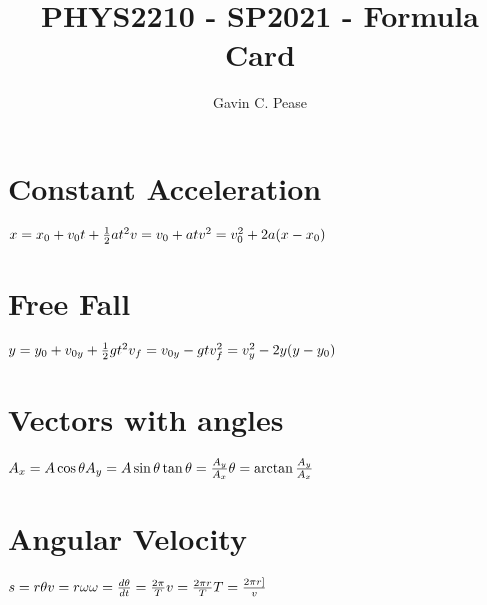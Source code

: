 \documentclass[14pt]{article}
\title{PHYS2210 - SP2021 - Formula Card}
\author{Gavin C. Pease}
\begin{document}
    \maketitle
    \section*{Constant Acceleration}
    \begin{fleqn}
        $
        x=x_0+v_0t + \frac{1}{2}at^2 \newline
        v=v_0+at \newline
        v^2 = v_0^2 +2a(x-x_0) \newline
        $
    \end{fleqn}
    \section*{Free Fall}
    \begin{fleqn}
        $
        y=y_0 +v_{0y} + \frac{1}{2}gt^2 \newline
        v_f=v_{0y}-gt \newline
        v_f^2 = v_y^2 -2y(y-y_0) \newline
        $
    \end{fleqn}
    \section*{Vectors with angles}
    \begin{fleqn}
        $
        A_x=A\cos\theta \newline
        A_y=A\sin\theta \newline
        \tan\theta = \frac{A_y}{A_x} \newline
        \theta = \arctan\frac{A_y}{A_x} \newline
        $
    \end{fleqn}

    \section*{Angular Velocity}
    \begin{fleqn}
        $
        s=r\theta \newline
        v=r\omega \newline
        \omega = \frac{d\theta}{dt} = \frac{2\pi}{T} \newline
        v = \frac{2\pi r}{T} \newline
        T = \frac{2\pi r]}{v} \newline
        $
    \end{fleqn}
\end{document}
